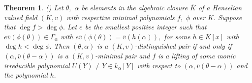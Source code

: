 \documentclass[11pt]{amsart}
\newtheorem{theorem}{Theorem}[section]
\theoremstyle{definition}
\theoremstyle{remark}
\numberwithin{equation}{section}
\begin{document}
\begin{theorem}(\cite[Theorem 1.2]{AN1})
Let $\theta,$ $\alpha$ be elements in the algebraic  closure $\overline{K}$ of a Henselian valued field $(K,v)$ with respective minimal polynomials $f,$ $\phi$ over $K.$ Suppose that $\deg f>\deg \phi.$ Let $e$ be the smallest positive integer such  that $e\bar{v}(\phi(\theta))\in\Gamma_\alpha$ with $e\bar{v}(\phi(\theta))=\bar{v}(h(\alpha)),$ for some $h\in K[x]$ with $\deg h<\deg \phi.$ Then  $(\theta,\alpha)$ is a $(K,v)$-distinguished pair if and only if $(\alpha,\bar{v}(\theta-\alpha))$ is a $(K,v)$-minimal pair and $f$ is a lifting of some monic irreducible polynomial $U(Y)\neq Y\in k_\alpha[Y]$ with respect to $(\alpha,\bar{v}(\theta-\alpha))$ and the polynomial $h.$
\end{theorem}

\end{document}

